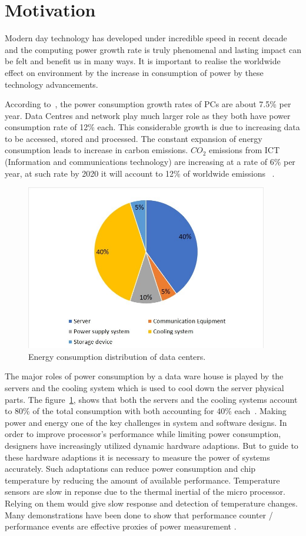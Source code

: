 \section{Motivation}
Modern day technology has developed under incredible speed in recent decade and the computing power growth rate is truly phenomenal and lasting impact can be felt and benefit us in many ways. It is important to realise the worldwide effect on environment by the increase in consumption of power by these technology advancements.

According to~\cite{pickavet2008worldwide}, the power consumption growth rates of PCs are about 7.5\% per year. Data Centres and network play much larger role as they both have power consumption rate of 12\% each. This considerable growth is due to increasing data to be accessed, stored and processed. The constant expansion of energy consumption leads to increase in carbon emissions. \(CO_2\) emissions from ICT (Information and communications technology) are increasing at a rate of 6\% per year, at such rate by 2020 it will account to 12\% of worldwide emissions ~\cite{rong2016optimizing}.

\begin{figure}[ht]
	\centering
	\includegraphics[width=300pt]{energypiechart}
	\caption{\label{fig:energypie} Energy consumption distribution of data centers.}
\end{figure}

The major roles of power consumption by a data ware house is played by the servers and the cooling system which is used to cool down the server physical parts. The figure~\ref{fig:energypie}, shows that both the servers and the cooling systems account to 80\% of the total consumption with both accounting for 40\% each~\cite{rong2016optimizing}. Making power and energy one of the key challenges in system and software designs. In order to improve processor's performance while limiting power consumption, designers have increasingly utilized dynamic hardware adaptions. But to guide to these hardware adaptions it is necessary to measure the power of systems accurately. Such adaptations can reduce power consumption and chip temperature by reducing the amount of available performance. Temperature sensors are slow in reponse due to the thermal inertial of the micro processor. Relying on them would give slow response and detection of temperature changes. Many demonstrations have been done to show that performance counter / performance events are effective proxies of power measurement \cite{bellosa2000benefits}.

